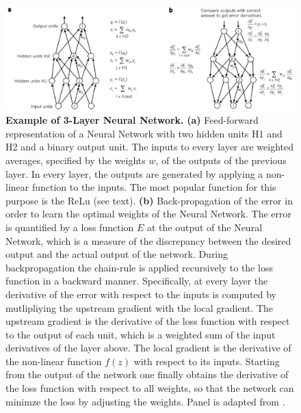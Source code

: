 \begin{figure}[h!]
	\centering
	\captionsetup{width=1\linewidth}
	\includegraphics[width=1\textwidth]{Figures/simple_neural_net.pdf}
	\caption{\textbf{Example of 3-Layer Neural Network.} \textbf{(a)} Feed-forward representation of a Neural Network with two hidden units H1 and H2 and a binary output unit. The inputs to every layer are weighted averages, specified by the weights $w$, of the outputs of the previous layer. In every layer, the outputs are generated by applying a non-linear function to the inputs. The most popular function for this purpose is the ReLu (see text). \textbf{(b)} Back-propagation of the error in order to learn the optimal weights of the Neural Network. The error is quantified by a loss function $E$ at the output of the Neural Network, which is a measure of the discrepancy between the desired output and the actual output of the network. During backpropagation the chain-rule is applied recursively to the loss function in a backward manner. Specifically, at every layer the derivative of the error with respect to the inputs is computed by mutlipliying the upstream gradient with the local gradient. The upstream gradient is the derivative of the loss function with respect to the output of each unit, which is a weighted sum of the input derivatives of the layer above. The local gradient is the derivative of the non-linear function $f(z)$ with respect to its inputs. Starting from the output of the network one finally obtains the derivative of the loss function with respect to all weights, so that the network can minimze the loss by adjusting the weights. Panel is adapted from \parencite{lecun2015}.}
	\label{fig:simple_neural_net}
\end{figure}

